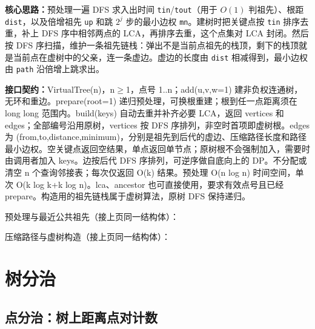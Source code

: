 \textbf{核心思路：}\allowbreak 预处理一遍 DFS 求入出时间 \texttt{tin}/\texttt{tout}（用于 $O(1)$ 判祖先）、根距 \texttt{dist}，以及倍增祖先 \texttt{up} 和跳 $2^j$ 步的最小边权 \texttt{mn}。建树时把关键点按 \texttt{tin} 排序去重，补上 DFS 序中相邻两点的 LCA，再排序去重，这个点集对 LCA 封闭。然后按 DFS 序扫描，维护一条祖先链栈：弹出不是当前点祖先的栈顶，剩下的栈顶就是当前点在虚树中的父亲，连一条虚边。虚边的长度由 \texttt{dist} 相减得到，最小边权由 \texttt{path} 沿倍增上跳求出。



{\sloppy{}\noindent\textbf{接口契约：}VirtualTree(n)，n$\ge$1，点号 1..n；add(u,v,w=1) 建非负权连通树，无环和重边。prepare(root=1) 递归预处理，可换根重建；根到任一点距离须在 long long 范围内。build(keys) 自动去重并补齐必要 LCA，返回 vertices 和 edges；全部编号沿用原树，vertices 按 DFS 序排列，非空时首项即虚树根。edges 为 (from,to,distance,minimum)，分别是祖先到后代的虚边、压缩路径长度和路径最小边权。空关键点返回空结果，单点返回单节点；原树根不会强制加入，需要时由调用者加入 keys。边按后代 DFS 序排列，可逆序做自底向上的 DP。不分配或清空 n 个查询邻接表；每次仅返回 O(k) 结果。预处理 O(n log n) 时间空间，单次 O(k log k+k log n)。lca、ancestor 也可直接使用，要求有效点号且已经 prepare。构造用的祖先链栈属于虚树算法，原树 DFS 保持递归。\par}

\Needspace{453pt}



\newpage

\noindent 预处理与最近公共祖先（接上页同一结构体）：



\newpage

\noindent 压缩路径与虚树构造（接上页同一结构体）：



\Needspace{180pt}

\section{树分治}

\subsection{点分治：树上距离点对计数}\label{compact-CentroidPairs}

